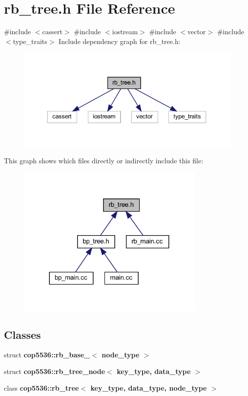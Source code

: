 \section{rb\+\_\+tree.\+h File Reference}
\label{rb__tree_8h}
{\ttfamily \#include $<$cassert$>$}\newline
{\ttfamily \#include $<$iostream$>$}\newline
{\ttfamily \#include $<$vector$>$}\newline
{\ttfamily \#include $<$type\+\_\+traits$>$}\newline
Include dependency graph for rb\+\_\+tree.\+h\+:
\nopagebreak
\begin{figure}[H]
\begin{center}
\leavevmode
\includegraphics[width=344pt]{rb__tree_8h__incl}
\end{center}
\end{figure}
This graph shows which files directly or indirectly include this file\+:
\nopagebreak
\begin{figure}[H]
\begin{center}
\leavevmode
\includegraphics[width=263pt]{rb__tree_8h__dep__incl}
\end{center}
\end{figure}
\subsection*{Classes}
\begin{DoxyCompactItemize}
\item 
struct \textbf{ cop5536\+::rb\+\_\+base\+\_\+$<$ node\+\_\+type $>$}
\item 
struct \textbf{ cop5536\+::rb\+\_\+tree\+\_\+node$<$ key\+\_\+type, data\+\_\+type $>$}
\item 
class \textbf{ cop5536\+::rb\+\_\+tree$<$ key\+\_\+type, data\+\_\+type, node\+\_\+type $>$}
\end{DoxyCompactItemize}
